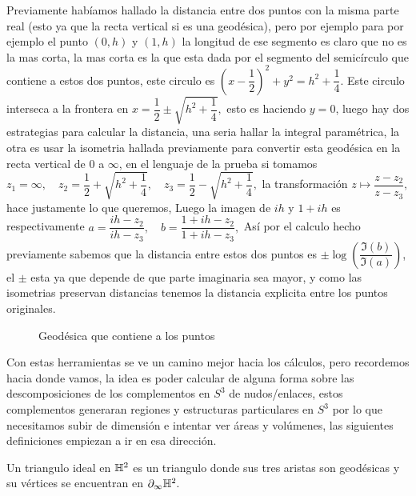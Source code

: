     \begin{eg}
       Previamente habíamos hallado la distancia entre dos puntos con la misma parte real (esto ya que la recta vertical si es una geodésica), pero por ejemplo para por ejemplo el punto $(0,h)$ y $(1,h)$ la longitud de ese segmento es claro que no es la mas corta, la mas corta es la que esta dada por el segmento del semicírculo que contiene a estos dos puntos, este circulo es 
       $\left(x-\dfrac{1}{2}\right)^2+y^2=h^2+\dfrac{1}{4}.$
       Este circulo interseca a la frontera en 
       $x=\dfrac{1}{2}\pm\sqrt{h^2+\dfrac{1}{4}},$ 
       esto es haciendo $y=0$, luego hay dos estrategias para calcular la distancia, una seria hallar la integral paramétrica, la otra es usar la isometria hallada previamente para convertir esta geodésica en la recta vertical de $0$ a $\infty$, en el lenguaje de la prueba si tomamos
       $z_1=\infty,\quad z_2=\dfrac{1}{2}+\sqrt{h^2+\dfrac{1}{4}},\quad z_3=\dfrac{1}{2}-\sqrt{h^2+\dfrac{1}{4}},$
       la transformación 
       $z\mapsto \dfrac{z-z_2}{z-z_3},$ hace justamente lo que queremos, Luego la imagen de $ih$ y $1+ih$ es respectivamente
       $a=\dfrac{ih-z_2}{ih-z_3},\quad b=\dfrac{1+ih-z_2}{1+ih-z_3},$
      Así por el calculo hecho previamente sabemos que la distancia entre estos dos puntos es $\pm\log\left(\dfrac{\Im(b)}{\Im(a)}\right)$, el $\pm$ esta ya que depende de que parte imaginaria sea mayor, y como las isometrias preservan distancias tenemos la distancia explicita entre los puntos originales. 
    \end{eg}

    \begin{figure}[H]
    \centering
    
        \caption{Geodésica que contiene a los puntos}
    \end{figure}

    Con estas herramientas se ve un camino mejor hacia los cálculos, pero recordemos hacia donde vamos, la idea es poder calcular de alguna forma sobre las descomposiciones de los complementos en $S^3$ de nudos/enlaces, estos complementos generaran regiones y estructuras particulares en $S^3$ por lo que necesitamos subir de dimensión e intentar ver áreas y volúmenes, las siguientes definiciones empiezan a ir en esa dirección.

    \begin{definition}
        Un triangulo ideal en $\mathbb{H}^2$ es un triangulo donde sus tres aristas son geodésicas y su vértices se encuentran en $\partial_\infty\mathbb{H}^2.$
    \end{definition}

